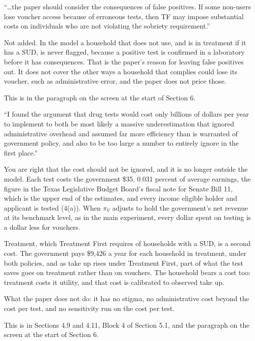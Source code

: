 \documentclass[11pt]{article}
\begin{document}
\begin{referee}
``\dots the paper should consider the consequences of false positives. If some
non-users lose voucher access because of erroneous tests, then TF may impose
substantial costs on individuals who are not violating the sobriety requirement.''
\end{referee}
\begin{response}
\open Not added. In the model a household that does not use, and is in treatment
if it has a SUD, is never flagged, because a positive test is confirmed in a
laboratory before it has consequences. That is the paper's reason for leaving
false positives out. It does not cover the other ways a household that complies
could lose its voucher, such as administrative error, and the paper does not
price those.

This is in the paragraph on the screen at the start of Section 6.
\end{response}

\begin{referee}
``I found the argument that drug tests would cost only billions of dollars per
year to implement to both be most likely a massive underestimation that ignored
administrative overhead and assumed far more efficiency than is warranted of
government policy, and also to be too large a number to entirely ignore in the
first place.''
\end{referee}
\begin{response}
You are right that the cost should not be ignored, and it is no longer outside
the model. Each test costs the government \$35, 0.031 percent of average
earnings, the figure in the Texas Legislative Budget Board's fiscal note for
Senate Bill 11, which is the upper end of the estimates, and every income eligible
holder and applicant is tested (4(a)). When $\pi_V$
adjusts to hold the government's net revenue at its benchmark level, as in the
main experiment, every dollar spent on testing is a dollar less for vouchers.

Treatment, which Treatment First requires of households with a SUD, is a second
cost. The government pays \$9,426 a year for each household in treatment, under
both policies, and as take up rises under Treatment First, part of what the test
saves goes on treatment rather than on vouchers. The household bears a cost too:
treatment costs it utility, and that cost is calibrated to observed take up.

\open What the paper does not do: it has no stigma, no administrative cost beyond
the cost per test, and no sensitivity run on the cost per test.

This is in Sections 4.9 and 4.11, Block 4 of Section 5.1, and the paragraph on
the screen at the start of Section 6.
\end{response}
\end{document}
